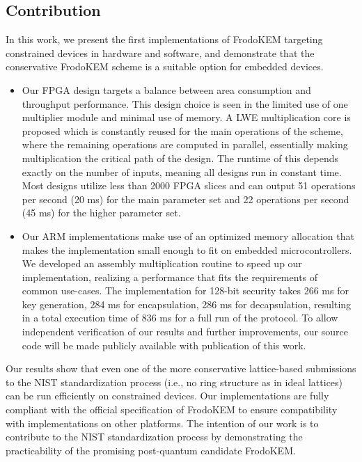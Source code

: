 \subsection{Contribution}
In this work, we present the first implementations of \textsf{FrodoKEM} targeting constrained devices in hardware and software, and demonstrate that the conservative \textsf{FrodoKEM} scheme is a suitable option for embedded devices.
 
\begin{itemize}
\item Our FPGA design targets a balance between area consumption and throughput performance. This design choice is seen in the limited use of one multiplier module and minimal use of memory. A LWE multiplication core is proposed which is constantly reused for the main operations of the scheme, where the remaining operations are computed in parallel, essentially making multiplication the critical path of the design. The runtime of this depends exactly on the number of inputs, meaning all designs run in constant time. Most designs utilize less than 2000 FPGA slices and can output 51 operations per second (20 ms) for the main parameter set and 22 operations per second (45 ms) for the higher parameter set.

\item Our ARM implementations make use of an optimized memory allocation that makes the implementation small enough to fit on embedded microcontrollers. We developed an assembly multiplication routine to speed up our implementation, realizing a performance that fits the requirements of common use-cases. The implementation for 128-bit security takes 266 ms for key generation, 284 ms for encapsulation, 286 ms for decapsulation, resulting in a total execution time of 836 ms for a full run of the protocol. To allow independent verification of our results and further improvements, our source code will be made publicly available with publication of this work.
\end{itemize}

Our results show that even one of the more conservative lattice-based submissions to the NIST standardization process (i.e., no ring structure as in ideal lattices) can be run efficiently on constrained devices. Our implementations are fully compliant with the official specification of \textsf{FrodoKEM} to ensure compatibility with implementations on other platforms. The intention of our work is to contribute to the NIST standardization process by demonstrating the practicability of the promising post-quantum candidate \textsf{FrodoKEM}.
